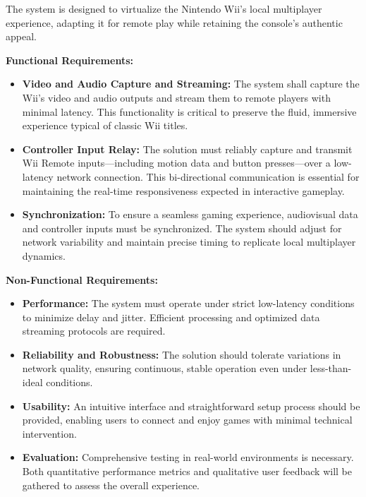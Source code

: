 \label{chapter:requirements}

The system is designed to virtualize the Nintendo Wii’s local multiplayer experience, adapting it for remote play while retaining the console’s authentic appeal.

\textbf{Functional Requirements:}
\begin{itemize}
	\item \textbf{Video and Audio Capture and Streaming:}
	      The system shall capture the Wii’s video and audio outputs and stream them to remote players with minimal latency. This functionality is critical to preserve the fluid, immersive experience typical of classic Wii titles.

	\item   \textbf{Controller Input Relay:}
	      The solution must reliably capture and transmit Wii Remote inputs—including motion data and button presses—over a low-latency network connection. This bi-directional communication is essential for maintaining the real-time responsiveness expected in interactive gameplay.

	\item    \textbf{Synchronization:}
	      To ensure a seamless gaming experience, audiovisual data and controller inputs must be synchronized. The system should adjust for network variability and maintain precise timing to replicate local multiplayer dynamics.


\end{itemize}


\textbf{Non-Functional Requirements:}
\begin{itemize}

	\item  \textbf{Performance:}
	      The system must operate under strict low-latency conditions to minimize delay and jitter. Efficient processing and optimized data streaming protocols are required.

	\item \textbf{Reliability and Robustness:}
	      The solution should tolerate variations in network quality, ensuring continuous, stable operation even under less-than-ideal conditions.

	\item \textbf{Usability:}
	      An intuitive interface and straightforward setup process should be provided, enabling users to connect and enjoy games with minimal technical intervention.

	\item \textbf{Evaluation:}
	      Comprehensive testing in real-world environments is necessary. Both quantitative performance metrics and qualitative user feedback will be gathered to assess the overall experience.


\end{itemize}
